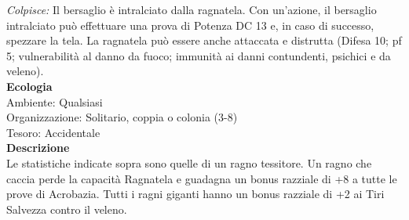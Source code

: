 \begin{multicols}{2}
\emph{Colpisce:} Il bersaglio è intralciato dalla ragnatela. Con un'azione, il bersaglio intralciato può effettuare una prova di Potenza DC  13 e, in caso di successo, spezzare la tela. La ragnatela può essere anche attaccata e distrutta (Difesa 10; pf 5; vulnerabilità al danno da fuoco; immunità ai danni contundenti, psichici e da veleno).\\
\textbf{Ecologia}\\
Ambiente: Qualsiasi\\
Organizzazione: Solitario, coppia o colonia (3-8)\\
Tesoro: Accidentale\\
\textbf{Descrizione}\\
Le statistiche indicate sopra sono quelle di un ragno tessitore. Un ragno che caccia perde la capacità Ragnatela e guadagna un bonus razziale di +8 a tutte le prove di Acrobazia. Tutti i ragni giganti hanno un bonus razziale di +2 ai Tiri Salvezza contro il veleno.\\


\end{multicols}

